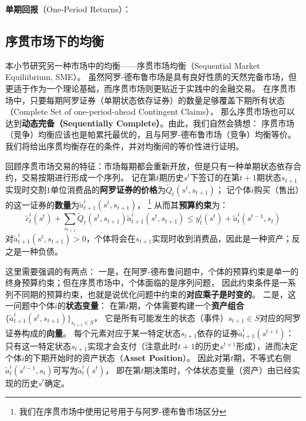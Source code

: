 \begin{example}
    \textbf{单期回报}（One-Period Returns）：
\end{example}


\subsection{序贯市场下的均衡}

本小节研究另一种市场中的均衡——序贯市场均衡（Sequential Market Equiliibrium, SME）。
虽然阿罗-德布鲁市场是具有良好性质的天然完备市场，但更适于作为一个理论基础，而序贯市场则更贴近于实践中的金融交易。
在序贯市场中，只要每期阿罗证券（单期状态依存证券）的数量足够覆盖下期所有状态（Complete Set of one-period-ahead Contingent Claims），
那么序贯市场也可以达到\textbf{动态完备（Sequentially Complete）}。由此，我们自然会猜想：
序贯市场（竞争）均衡应该也是帕累托最优的，且与阿罗-德布鲁市场（竞争）均衡等价。我们将给出序贯均衡存在的条件，并对均衡间的等价性进行证明。

回顾序贯市场交易的特征：市场每期都会重新开放，但是只有一种单期状态依存合约，交易按期进行形成一个序列。
记在第$t$期历史$s^t$下签订的在第$t+1$期状态$s_{t+1}$实现时交割$1$单位消费品的\textbf{阿罗证券的价格}为$\tilde{Q}_t\left(s^t,s_{t+1}\right)$；
记个体$i$购买（售出）的这一证券的\textbf{数量}为$\tilde{a}_{t+1}^i\left(s^t,s_{t+1}\right)$，
\footnote{我们在序贯市场中使用$\tilde{}$记号用于与阿罗-德布鲁市场区分}
从而其\textbf{预算约束}为：
\begin{equation}    \label{eq-sq-bc}
    \tilde{c}_t^i\left(s^t\right)+\sum_{s_{t+1}} \tilde{Q}_t\left(s^t, s_{t+1}\right) \tilde{a}_{t+1}^i\left(s^t, s_{t+1}\right) 
        \leq y_t^i\left(s^t\right)+\tilde{a}_t^i\left(s^{t-1}, s_t\right)
\end{equation}
对$\tilde{a}_{t+1}^i\left(s^t,s_{t+1}\right)>0$，个体将会在$s_{t+1}$实现时收到消费品，因此是一种资产；反之是一种负债。

这里需要强调的有两点：
一是，在阿罗-德布鲁问题中，个体的预算约束是单一的终身预算约束；但在序贯市场中，个体面临的是序列问题，
因此约束条件是一系列不同期的预算约束，也就是说优化问题中约束的\textbf{对应乘子是时变的}。
二是，这一问题中个体$i$的\textbf{状态变量}：
在第$t$期，个体需要构建一个\textbf{资产组合}$\{\tilde{a}_{t+1}^i\left(s^t,s_{t+1}\right)\}_{s_{t+1}\in S}$，
它是所有可能发生的状态（事件）$s_{t+1}\in S$对应的阿罗证券构成的\textbf{向量}。
每个元素对应于某一特定状态$s_{t+1}$依存的证券$\tilde{a}_{t+1}^i\left(s^{t+1}\right)$：
只有这一特定状态$s_{t+1}$实现才会支付（注意此时$t+1$的历史$s^{t+1}$形成），进而决定个体$i$的下期开始时的资产状态（\textbf{Asset Position}）。
因此对第$t$期，不等式右侧$\tilde{a}_{t}^i\left(s^{t-1}, s_t\right)$可写为$\tilde{a}_t^i\left(s^t\right)$，
即在第$t$期决策时，个体状态变量（资产）由已经实现的历史$s^t$确定。

